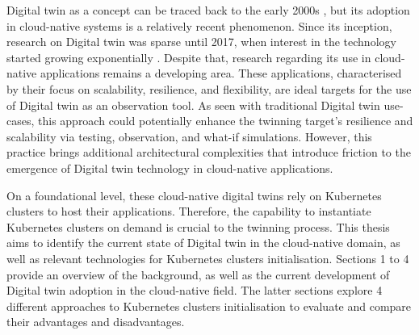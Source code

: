 Digital twin as a concept can be traced back to the early 2000s \cite{grieves_digital_2015}, but its adoption in cloud-native systems is a relatively recent phenomenon. Since its inception, research on Digital twin was sparse until 2017, when interest in the technology started growing exponentially \cite{ketzler_digital_2020}. Despite that, research regarding its use in cloud-native applications remains a developing area. These applications, characterised by their focus on scalability, resilience, and flexibility, are ideal targets for the use of Digital twin as an observation tool. As seen with traditional Digital twin use-cases, this approach could potentially enhance the twinning target's resilience and scalability via testing, 
observation, and what-if simulations. However, this practice brings additional architectural complexities that introduce friction to the emergence of Digital twin technology in cloud-native applications.

On a foundational level, these cloud-native digital twins rely on Kubernetes clusters to host their applications. Therefore, the capability to instantiate Kubernetes clusters on demand is crucial to the twinning process. This thesis aims to identify the current state of Digital twin in the cloud-native domain, as well as relevant technologies for Kubernetes clusters initialisation. Sections 1 to 4 provide an overview of the background, as well as the current development of Digital twin adoption in the cloud-native field. The latter sections explore 4 different approaches to Kubernetes clusters initialisation to evaluate and compare their advantages and disadvantages.




